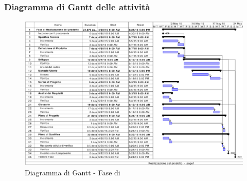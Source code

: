 \subsubsection{Diagramma di Gantt delle attività}
\begin{figure}[h]
\centering
\includegraphics[width=\textwidth,keepaspectratio]{../immagini/gantt/realizzazioneProdottoP.png}
\caption{Diagramma di Gantt - Fase di \fCt}\label{fig:ganttFC}
\end{figure}
\FloatBarrier
